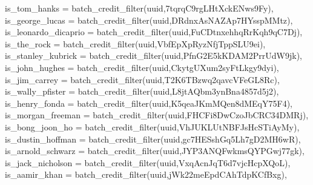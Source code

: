 \documentclass[
]{article}
\newenvironment{Shaded}{\begin{snugshade}}{\end{snugshade}}
\newcommand{\AttributeTok}[1]{\textcolor[rgb]{0.77,0.63,0.00}{#1}}
\newcommand{\FunctionTok}[1]{\textcolor[rgb]{0.00,0.00,0.00}{#1}}
\newcommand{\NormalTok}[1]{#1}
\newcommand{\StringTok}[1]{\textcolor[rgb]{0.31,0.60,0.02}{#1}}
\begin{document}
\begin{Shaded}
\begin{Highlighting}[]
    \AttributeTok{is\_tom\_hanks =} \FunctionTok{batch\_credit\_filter}\NormalTok{(uuid,}\StringTok{\textquotesingle{}7tqrqC9rgLHtXckENws9Fy\textquotesingle{}}\NormalTok{),}
    \AttributeTok{is\_george\_lucas =} \FunctionTok{batch\_credit\_filter}\NormalTok{(uuid,}\StringTok{\textquotesingle{}DRdnxAsNAZAp7HYsspMMtz\textquotesingle{}}\NormalTok{),}
    \AttributeTok{is\_leonardo\_dicaprio =} \FunctionTok{batch\_credit\_filter}\NormalTok{(uuid,}\StringTok{\textquotesingle{}FuCDtnxehhqRrKqh9qC7Dj\textquotesingle{}}\NormalTok{),}
    \AttributeTok{is\_the\_rock =} \FunctionTok{batch\_credit\_filter}\NormalTok{(uuid,}\StringTok{\textquotesingle{}VbfEpXpRyzNfjTppSLU9ei\textquotesingle{}}\NormalTok{),}
    \AttributeTok{is\_stanley\_kubrick =} \FunctionTok{batch\_credit\_filter}\NormalTok{(uuid,}\StringTok{\textquotesingle{}PfnG2E5kKDAM2PrrUdW9jk\textquotesingle{}}\NormalTok{),}
    \AttributeTok{is\_john\_hughes =} \FunctionTok{batch\_credit\_filter}\NormalTok{(uuid,}\StringTok{\textquotesingle{}CkytgUXum2syFtLkgy9dyi\textquotesingle{}}\NormalTok{),}
    \AttributeTok{is\_jim\_carrey =} \FunctionTok{batch\_credit\_filter}\NormalTok{(uuid,}\StringTok{\textquotesingle{}T2K6TBzwq2qavcVFeGL8Rc\textquotesingle{}}\NormalTok{),}
    \AttributeTok{is\_wally\_pfister =} \FunctionTok{batch\_credit\_filter}\NormalTok{(uuid,}\StringTok{\textquotesingle{}L8jtAQbm3ynBna4857d5j2\textquotesingle{}}\NormalTok{),}
    \AttributeTok{is\_henry\_fonda =} \FunctionTok{batch\_credit\_filter}\NormalTok{(uuid,}\StringTok{\textquotesingle{}K5qeaJKmMQen8dMEqY75F4\textquotesingle{}}\NormalTok{),}
    \AttributeTok{is\_morgan\_freeman =} \FunctionTok{batch\_credit\_filter}\NormalTok{(uuid,}\StringTok{\textquotesingle{}FHCFi8DwCzoJbCRC34DMRj\textquotesingle{}}\NormalTok{),}
    \AttributeTok{is\_bong\_joon\_ho =} \FunctionTok{batch\_credit\_filter}\NormalTok{(uuid,}\StringTok{\textquotesingle{}VhJUKLUtNBFJsHcSTiAyMy\textquotesingle{}}\NormalTok{),}
    \AttributeTok{is\_dustin\_hoffman =} \FunctionTok{batch\_credit\_filter}\NormalTok{(uuid,}\StringTok{\textquotesingle{}gc7HESshGq5Lh7gD2MH6wR\textquotesingle{}}\NormalTok{),}
    \AttributeTok{is\_arnold\_schwarz =} \FunctionTok{batch\_credit\_filter}\NormalTok{(uuid,}\StringTok{\textquotesingle{}JYP3ANQFwkmsQYPGwj77gk\textquotesingle{}}\NormalTok{),}
    \AttributeTok{is\_jack\_nicholson =} \FunctionTok{batch\_credit\_filter}\NormalTok{(uuid,}\StringTok{\textquotesingle{}VxqAcnJqT6d7vjcHcpXQoL\textquotesingle{}}\NormalTok{),}
    \AttributeTok{is\_aamir\_khan =} \FunctionTok{batch\_credit\_filter}\NormalTok{(uuid,}\StringTok{\textquotesingle{}jWk22meEpdCAhTdpKCfBxg\textquotesingle{}}\NormalTok{),}

\end{Highlighting}
\end{Shaded}
\end{document}
